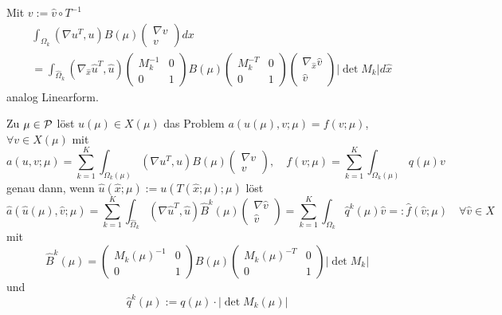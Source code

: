 \begin{itemize}
		Mit $v := \hat v \circ T^{-1}$
		\begin{align*}
			&\int_{\Omega_k} (\nabla u^T, u) B(\mu) \begin{pmatrix} \nabla v \\ v \end{pmatrix} dx\\
			&= \int_{\hat\Omega_k} (\nabla_{\hat x} \hat u^T, \hat u) \begin{pmatrix} M_k^{-1} & 0 \\ 0 & 1 \end{pmatrix} B(\mu) \begin{pmatrix} M_k^{-T} & 0 \\ 0 & 1 \end{pmatrix} \begin{pmatrix} \nabla_{\hat x} \hat v \\ \hat v \end{pmatrix} |\det M_k| d \hat x
		\end{align*}
		analog Linearform.
\end{itemize}

\begin{satz}
	Zu $\mu \in \mathcal{P}$ löst $u(\mu) \in X(\mu)$ das Problem $a(u(\mu),v;\mu) = f(v;\mu)$, $\forall v \in X(\mu)$ mit
	\[
		a(u,v;\mu) = \sum_{k=1}^K \int_{\Omega_k(\mu)} (\nabla u^T, u) B(\mu) \begin{pmatrix} \nabla v \\ v \end{pmatrix}, \quad f(v;\mu) = \sum_{k=1}^{K} \int_{\Omega_k(\mu)} q(\mu) v
	\]
	genau dann, wenn $\hat u(\hat x; \mu) := u(T(\hat x;\mu);\mu)$ löst
	\[
		\hat a(\hat u(\mu), \hat v; \mu) = \sum_{k=1}^{K} \int_{\hat \Omega_k} (\nabla \hat u^T, \hat u) \hat B^k(\mu) \begin{pmatrix} \nabla \hat v \\ \hat v \end{pmatrix} = \sum_{k=1}^K \int_{\Omega_k} \hat q^k(\mu) \hat v =: \hat f(\hat v; \mu) \quad \forall \hat v \in \hat X
	\]
	mit
	\[
		\hat B^k(\mu) = \begin{pmatrix} M_k(\mu)^{-1} & 0 \\ 0 & 1 \end{pmatrix} B(\mu) \begin{pmatrix} M_k(\mu)^{-T} & 0 \\ 0 & 1 \end{pmatrix} |\det M_k|
	\]
	und
	\[
		\hat q^k(\mu) := q(\mu) \cdot |\det M_k(\mu)|
	\]
\end{satz}
